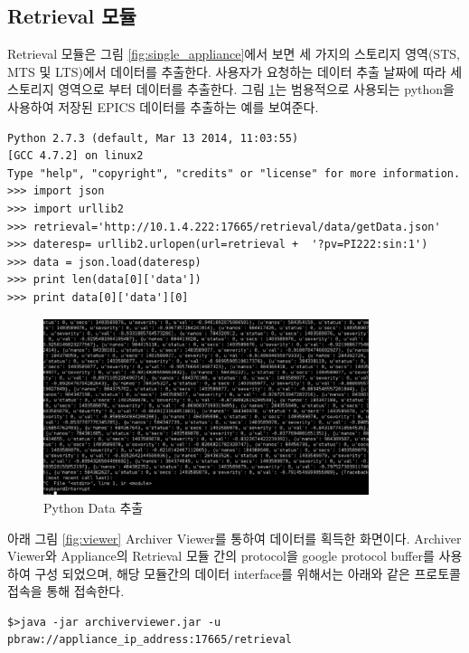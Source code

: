 \documentclass[11pt
  , a4paper
  , article
  , oneside
]{memoir}
\begin{document}
\subsection*{Retrieval 모듈}
Retrieval 모듈은 그림 \ref{fig:single_appliance}에서 보면 세 가지의 스토리지 영역(STS, MTS 및 LTS)에서 데이터를 추출한다. 사용자가 요청하는 데이터 추출 날짜에 따라 세 스토리지 영역으로 부터 데이터를 추출한다. 그림 \ref{fig:python_ext}는 범용적으로 사용되는 python을 사용하여 저장된 EPICS 데이터를 추출하는 예를 보여준다. 
\hfil\break

\begin{lstlisting}[style=termstyle]
Python 2.7.3 (default, Mar 13 2014, 11:03:55) 
[GCC 4.7.2] on linux2
Type "help", "copyright", "credits" or "license" for more information.
>>> import json
>>> import urllib2
>>> retrieval='http://10.1.4.222:17665/retrieval/data/getData.json'
>>> dateresp= urllib2.urlopen(url=retrieval +  '?pv=PI222:sin:1')
>>> data = json.load(dateresp)
>>> print len(data[0]['data'])
>>> print data[0]['data'][0]
\end{lstlisting}

\begin{figure}[h!]
	\centering
	\includegraphics[width=0.85\textwidth,height=0.55\textwidth]{./images/image-7.eps}
	\caption{Python Data 추출}
	\label{fig:python_ext} 
\end{figure}


아래 그림 \ref{fig:viewer} Archiver Viewer를 통하여 데이터를 획득한 화면이다. Archiver Viewer와 Appliance의 Retrieval 모듈 간의 protocol을 google protocol buffer를 사용하여 구성 되었으며, 해당 모듈간의 데이터 interface를 위해서는 아래와 같은 프로토콜 접속을 통해 접속한다.
\begin{lstlisting}[style=termstyle]
$>java -jar archiverviewer.jar -u pbraw://appliance_ip_address:17665/retrieval
\end{lstlisting}
\end{document}
